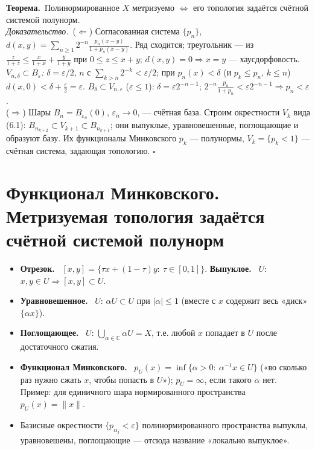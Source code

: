 \documentclass[11pt,a4paper]{article}
\newcommand{\CC}{\mathbb C}
\newcommand{\df}[1]{\textbf{#1.}~}
\newcommand{\thm}{\textbf{Теорема.}~}
\newcommand{\pf}{\textit{Доказательство.}~}
\newcommand{\qedd}{\hfill$\square$}
\begin{document}
\thm Полинормированное $X$ метризуемо $\iff$ его топология задаётся счётной системой полунорм.\\
\pf ($\Leftarrow$) Согласованная система $\{p_n\}$, $d(x,y)=\sum_{n\ge1}2^{-n}\frac{p_n(x-y)}{1+p_n(x-y)}$. Ряд сходится; треугольник — из $\frac z{1+z}\le\frac x{1+x}+\frac y{1+y}$ при $0\le z\le x+y$; $d(x,y)=0\Rightarrow x=y$ — хаусдорфовость. \textit{$V_{n,\delta}\subset B_\varepsilon$:} $\delta=\varepsilon/2$, $n$ с $\sum_{k>n}2^{-k}<\varepsilon/2$; при $p_n(x)<\delta$ (и $p_k\le p_n$, $k\le n$) $d(x,0)<\delta+\frac\varepsilon2=\varepsilon$. \textit{$B_\delta\subset V_{n,\varepsilon}$} ($\varepsilon\le1$): $\delta=\varepsilon2^{-n-1}$; $2^{-n}\frac{p_n}{1+p_n}<\varepsilon2^{-n-1}\Rightarrow p_n<\varepsilon$.\\
($\Rightarrow$) Шары $B_n=B_{\varepsilon_n}(0)$, $\varepsilon_n\to0$, — счётная база. Строим окрестности $V_k$ вида (6.1): $B_{n_{k+2}}\subset V_{k+1}\subset B_{n_{k+1}}$; они выпуклые, уравновешенные, поглощающие и образуют базу. Их функционалы Минковского $p_k$ — полунормы, $V_k=\{p_k<1\}$ — счётная система, задающая топологию. \qedd

\section{Функционал Минковского. Метризуемая топология задаётся счётной системой полунорм}
\begin{defs}
\begin{itemize}
\item \df{Отрезок} $[x,y]=\{\tau x+(1-\tau)y:\ \tau\in[0,1]\}$. \df{Выпуклое} $U$: $x,y\in U\Rightarrow[x,y]\subset U$.
\item \df{Уравновешенное} $U$: $\alpha U\subset U$ при $|\alpha|\le1$ (вместе с $x$ содержит весь «диск» $\{\alpha x\}$).
\item \df{Поглощающее} $U$: $\bigcup_{\alpha\in\CC}\alpha U=X$, т.е. любой $x$ попадает в $U$ после достаточного сжатия.
\item \df{Функционал Минковского} $p_U(x)=\inf\{\alpha>0:\ \alpha^{-1}x\in U\}$ («во сколько раз нужно сжать $x$, чтобы попасть в $U$»); $p_U=\infty$, если такого $\alpha$ нет. Пример: для единичного шара нормированного пространства $p_U(x)=\|x\|$.
\item Базисные окрестности $\{p_{\alpha_j}<\varepsilon\}$ полинормированного пространства выпуклы, уравновешены, поглощающие — отсюда название «локально выпуклое».
\end{itemize}
\end{defs}
\end{document}
